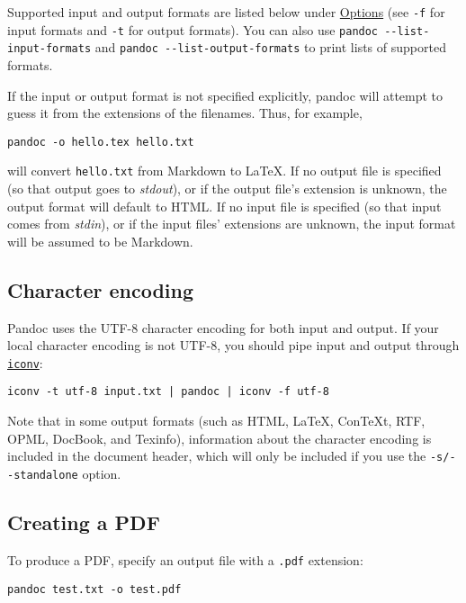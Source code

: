 Supported input and output formats are listed below under
\protect\hyperlink{options}{Options} (see \texttt{-f} for input formats
and \texttt{-t} for output formats). You can also use
\texttt{pandoc\ -\/-list-input-formats} and
\texttt{pandoc\ -\/-list-output-formats} to print lists of supported
formats.

If the input or output format is not specified explicitly, pandoc will
attempt to guess it from the extensions of the filenames. Thus, for
example,

\begin{verbatim}
pandoc -o hello.tex hello.txt
\end{verbatim}

will convert \texttt{hello.txt} from Markdown to LaTeX. If no output
file is specified (so that output goes to \emph{stdout}), or if the
output file's extension is unknown, the output format will default to
HTML. If no input file is specified (so that input comes from
\emph{stdin}), or if the input files' extensions are unknown, the input
format will be assumed to be Markdown.

\hypertarget{character-encoding}{%
\subsection{Character encoding}\label{character-encoding}}

Pandoc uses the UTF-8 character encoding for both input and output. If
your local character encoding is not UTF-8, you should pipe input and
output through
\href{https://www.gnu.org/software/libiconv/}{\texttt{iconv}}:

\begin{verbatim}
iconv -t utf-8 input.txt | pandoc | iconv -f utf-8
\end{verbatim}

Note that in some output formats (such as HTML, LaTeX, ConTeXt, RTF,
OPML, DocBook, and Texinfo), information about the character encoding is
included in the document header, which will only be included if you use
the \texttt{-s/-\/-standalone} option.

\hypertarget{creating-a-pdf}{%
\subsection{Creating a PDF}\label{creating-a-pdf}}

To produce a PDF, specify an output file with a \texttt{.pdf} extension:

\begin{verbatim}
pandoc test.txt -o test.pdf
\end{verbatim}

